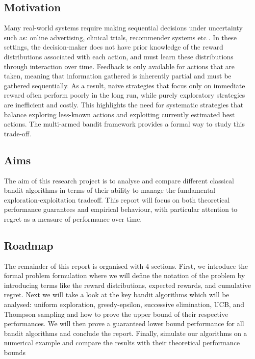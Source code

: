\documentclass[12pt]{article}
\begin{document}
\subsection{Motivation}

Many real-world systems require making sequential decisions under uncertainty such as: online advertising, clinical trials, recommender systems etc \cite{article2}. In these settings, the decision-maker does not have prior knowledge of the reward distributions associated with each action, and must learn these distributions through interaction over time. Feedback is only available for actions that are taken, meaning that information gathered is inherently partial and must be gathered sequentially. As a result, naive strategies that focus only on immediate reward often perform poorly in the long run, while purely exploratory strategies are inefficient and costly. This highlights the need for systematic strategies that balance exploring less-known actions and exploiting currently estimated best actions. The multi-armed bandit framework provides a formal way to study this trade-off.

\subsection{Aims}

The aim of this research project is to analyse and compare different classical bandit algorithms in terms of their ability to manage the fundamental exploration-exploitation tradeoff. This report will focus on both theoretical performance guarantees and empirical behaviour, with particular attention to regret as a measure of performance over time. 

\subsection{Roadmap}

The remainder of this report is organised with 4 sections. First, we introduce the formal problem formulation where we will define the notation of the problem by introducing terms like the reward distributions, expected rewards, and cumulative regret. Next we will take a look at the key bandit algorithms which will be analysed: uniform exploration, greedy-epsilon, successive elimination, UCB, and Thompson sampling and how to prove the upper bound of their respective performances. We will then prove a guaranteed lower bound performance for all bandit algorithms and conclude the report. Finally, simulate our algorithms on a numerical example and compare the results with their theoretical performance bounds
\end{document}
